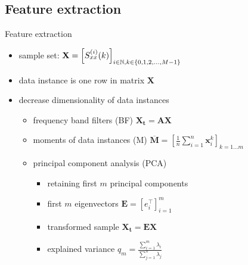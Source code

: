 \documentclass{beamer}
\begin{document}
\subsection{Feature extraction}
\begin{frame}{Feature extraction}
\begin{itemize}
	\item<1-> sample set: $\mathbf{X} = {\left[{ S_{xx}^{\left({ i }\right)}{\left({ k }\right)} }\right]}_{i\in \mathbb{N},k \in \left\{ 0,1,2,...,M-1 \right\}}$
	\item<2-> data instance is one row in matrix $\mathbf{X}$
	\item<3-> decrease dimensionality of data instances
	\begin{itemize}
		\item<4-> frequency band filters (BF) $\mathbf{X_t} = \mathbf{A} \mathbf{X}$
		\item<5-> moments of data instances (M) $\overline{\mathbf{M}} = \left[ \frac{1}{n} \sum_{i=1}^n\mathbf{x}_i^k\right]_{k=1\dots m}$ \\
		
		\item<6-> \alert<11>{principal component analysis (PCA)}
		\begin{itemize}
			\item<7-> retaining first $m$ principal components
			\item<8-> first $m$ eigenvectors $\mathbf{E} = \left[ e_i^\top \right]_{i=1}^m$
			\item<9-> transformed sample $\mathbf{X_t} = \mathbf{E} \mathbf{X}$
			\item<10-> explained variance $q_m = \frac{\sum_{i=1}^m\lambda_i}{\sum_{j=1}^n\lambda_j} $
		\end{itemize}
	\end{itemize}
\end{itemize}
\end{frame}
\end{document}
